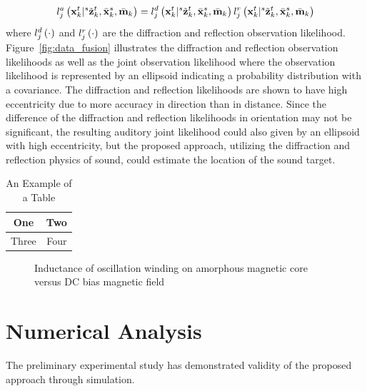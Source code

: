 \documentclass[letterpaper, 10 pt, conference]{ieeeconf}  %
\begin{document}
\begin{equation}\label{eq:joint_auditory}
l_j^{a} \left ( \mathbf{x}_{k}^{t}|{}^{s}\tilde {\mathbf{z}}_{k}^{t},\bar {\mathbf{x}}_{k}^{s},\bar {\mathbf{m}}_{k} \right ) = l_j^{d} \left ( \mathbf{x}_{k}^{t}|{}^{s}\tilde {\mathbf{z}}_{k}^{t},\bar {\mathbf{x}}_{k}^{s},\bar {\mathbf{m}}_{k} \right ) l_j^{r} \left ( \mathbf{x}_{k}^{t}|{}^{s}\tilde {\mathbf{z}}_{k}^{t},\bar {\mathbf{x}}_{k}^{s},\bar {\mathbf{m}}_{k} \right ) 
\end{equation}
where $l_j^{d} \left ( \cdot \right )$ and $l_j^{r} \left ( \cdot \right )$ are the diffraction and reflection observation likelihood.  
Figure~\ref{fig:data_fusion} illustrates the diffraction and reflection observation likelihoods as well as the joint observation likelihood where the observation likelihood is represented by an ellipsoid indicating a probability distribution with a covariance.  The diffraction and reflection likelihoods are shown to have high eccentricity due to more accuracy in direction than in distance.  Since the difference of the diffraction and reflection likelihoods in orientation may not be significant, the resulting auditory joint likelihood could also given by an ellipsoid with high eccentricity, but the proposed approach, utilizing the diffraction and reflection physics of sound, could estimate the location of the sound target.  


\begin{table}[h]
\caption{An Example of a Table}
\label{table_example}
\begin{center}
\begin{tabular}{|c||c|}
\hline
One & Two\\
\hline
Three & Four\\
\hline
\end{tabular}
\end{center}
\end{table}


   \begin{figure}[thpb]
      \centering
      \caption{Inductance of oscillation winding on amorphous
       magnetic core versus DC bias magnetic field}
      \label{figurelabel}
   \end{figure}

\section{Numerical Analysis}
The preliminary experimental study has demonstrated validity of the proposed approach through simulation.
\end{document}
